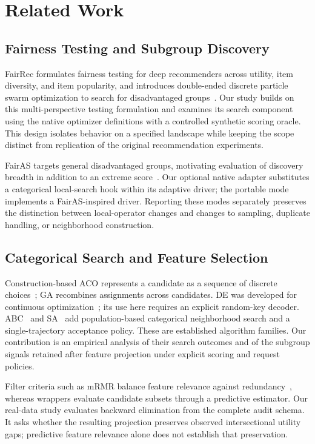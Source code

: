 \documentclass[sigconf,nonacm]{acmart}
\begin{document}
\section{Related Work}
\label{sec:related}

\subsection{Fairness Testing and Subgroup Discovery}
FairRec formulates fairness testing for deep recommenders across utility, item diversity, and item popularity, and introduces double-ended discrete particle swarm optimization to search for disadvantaged groups~\cite{guo2023fairrec}. Our study builds on this multi-perspective testing formulation and examines its search component using the native optimizer definitions with a controlled synthetic scoring oracle. This design isolates behavior on a specified landscape while keeping the scope distinct from replication of the original recommendation experiments.

FairAS targets general disadvantaged groups, motivating evaluation of discovery breadth in addition to an extreme score~\cite{wu2025nobias}. Our optional native adapter substitutes a categorical local-search hook within its adaptive driver; the portable mode implements a FairAS-inspired driver. Reporting these modes separately preserves the distinction between local-operator changes and changes to sampling, duplicate handling, or neighborhood construction.

\subsection{Categorical Search and Feature Selection}
Construction-based ACO represents a candidate as a sequence of discrete choices~\cite{dorigo1996ants}; GA recombines assignments across candidates. DE was developed for continuous optimization~\cite{storn1997de}; its use here requires an explicit random-key decoder. ABC~\cite{karaboga2007abc} and SA~\cite{kirkpatrick1983sa} add population-based categorical neighborhood search and a single-trajectory acceptance policy. These are established algorithm families. Our contribution is an empirical analysis of their search outcomes and of the subgroup signals retained after feature projection under explicit scoring and request policies.

Filter criteria such as mRMR balance feature relevance against redundancy~\cite{peng2005mrmr}, whereas wrappers evaluate candidate subsets through a predictive estimator. Our real-data study evaluates backward elimination from the complete audit schema. It asks whether the resulting projection preserves observed intersectional utility gaps; predictive feature relevance alone does not establish that preservation.
\end{document}
